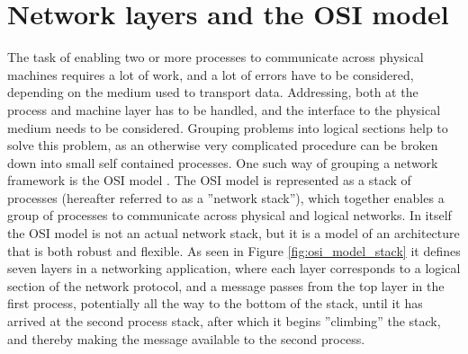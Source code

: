 \section{Network layers and the OSI model}
The task of enabling two or more processes to communicate across physical machines requires a lot of work, and a lot of errors have to be considered, depending on the medium used to transport data. Addressing, both at the process and machine layer has to be handled, and the interface to the physical medium needs to be considered. Grouping problems into logical sections help to solve this problem, as an otherwise very complicated procedure can be broken down into small self contained processes.
One such way of grouping a network framework is the OSI model \cite[27-42]{KOM}. The OSI model is represented as a stack of processes (hereafter referred to as a ''network stack''), which together enables a group of processes to communicate across physical and logical networks.
In itself the OSI model is not an actual network stack, but it is a model of an architecture that is both robust and flexible. 
As seen in Figure \ref{fig:osi_model_stack} it defines seven layers in a networking application, where each layer corresponds to a logical section of the network protocol, and a message passes from the top layer in the first process, potentially all the way to the bottom of the stack, until it has arrived at the second process stack, after which it begins ''climbing'' the stack, and thereby making the message available to the second process.

